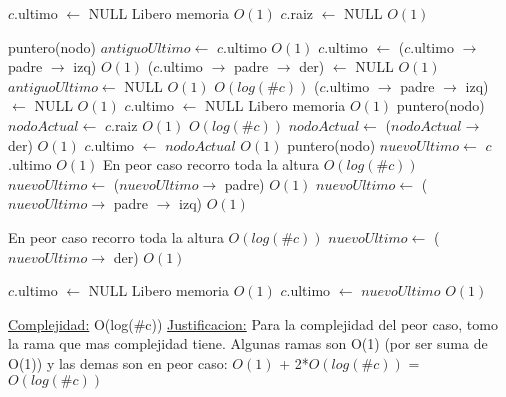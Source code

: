 \begin{Algoritmos}
\begin{algorithm}[H]
\begin{algorithmic}[1]
        \State $c$.ultimo $\gets$ NULL \Comment Libero memoria $O(1)$
        \State $c$.raiz $\gets$ NULL \Comment $O(1)$
    \Else

        \State puntero(nodo) $antiguoUltimo \gets$ $c$.ultimo \Comment $O(1)$
        \State $c$.ultimo $\gets$ ($c$.ultimo $\to$ padre $\to$ izq) \Comment $O(1)$
        \State ($c$.ultimo $\to$ padre $\to$ der) $\gets$ NULL \Comment $O(1)$
        \State $antiguoUltimo \gets$ NULL \Comment $O(1)$
    \Else
         \Comment $O(log(\#c))$
            \State ($c$.ultimo $\to$ padre $\to$ izq) $\gets$ NULL \Comment $O(1)$
            \State $c$.ultimo $\gets$ NULL \Comment Libero memoria $O(1)$
            \State puntero(nodo) $nodoActual \gets$ $c$.raiz \Comment $O(1)$
             \Comment $O(log(\#c))$
                $nodoActual \gets$ ($nodoActual \to$ der) \Comment $O(1)$
            \EndWhile
            \State $c$.ultimo $\gets$ $nodoActual$ \Comment $O(1)$
        \Else
            \State puntero(nodo) $nuevoUltimo \gets$ $c$.ultimo \Comment $O(1)$
              \Comment En peor caso recorro toda la altura $O(log(\#c))$
                \State $nuevoUltimo \gets$ ($nuevoUltimo \to$ padre) \Comment $O(1)$  
            \EndWhile
            \State $nuevoUltimo \gets$ ($nuevoUltimo \to$ padre $\to$ izq)  \Comment $O(1)$

              \Comment En peor caso recorro toda la altura  $O(log(\#c))$
                \State $nuevoUltimo \gets$ ($nuevoUltimo \to$ der) \Comment $O(1)$  
            \EndWhile

            \State $c$.ultimo $\gets$ NULL \Comment Libero memoria $O(1)$
            \State $c$.ultimo $\gets$ $nuevoUltimo$ \Comment $O(1)$

        \EndIf


    \EndIf

    \EndIf

    \medskip
    \Statex \underline{Complejidad:} O(log($\#$c))
    \Statex \underline{Justificacion:} Para la complejidad del peor caso, tomo la rama que mas complejidad tiene. Algunas ramas son O(1) (por ser suma de O(1)) y las demas son en peor caso: $O(1)$ + 2*$O(log(\#c))$ = $O(log(\#c))$

\end{algorithmic}
\end{algorithm}


\end{Algoritmos}
